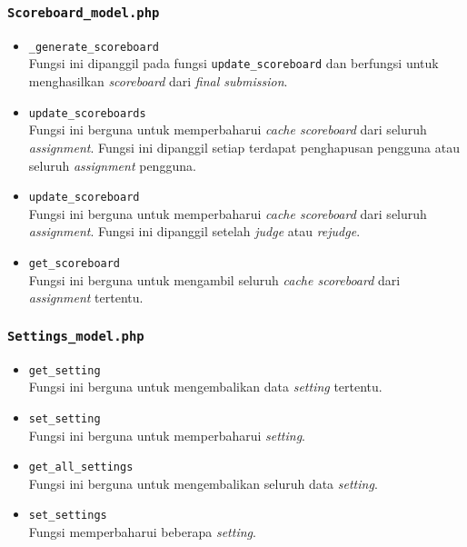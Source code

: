 \subsubsection{\texttt{Scoreboard\_model.php}}
\begin{itemize}
	\item \texttt{\_generate\_scoreboard}\\
	Fungsi ini dipanggil pada fungsi \texttt{update\_scoreboard} dan berfungsi untuk menghasilkan \textit{scoreboard} dari \textit{final submission}.
	\item \texttt{update\_scoreboards}\\
	Fungsi ini berguna untuk memperbaharui \textit{cache scoreboard} dari seluruh \textit{assignment}. Fungsi ini dipanggil setiap terdapat penghapusan pengguna atau seluruh \textit{assignment} pengguna.
	\item \texttt{update\_scoreboard}\\
	Fungsi ini berguna untuk memperbaharui \textit{cache scoreboard} dari seluruh \textit{assignment}. Fungsi ini dipanggil setelah \textit{judge} atau \textit{rejudge}.
	\item \texttt{get\_scoreboard}\\
	Fungsi ini berguna untuk mengambil seluruh \textit{cache scoreboard} dari \textit{assignment} tertentu.
\end{itemize}
\subsubsection{\texttt{Settings\_model.php}}
\begin{itemize}
	\item \texttt{get\_setting}\\
	Fungsi ini berguna untuk mengembalikan data \textit{setting} tertentu.
	\item \texttt{set\_setting}\\
	Fungsi ini berguna untuk memperbaharui \textit{setting}.
	\item \texttt{get\_all\_settings}\\
	Fungsi ini berguna untuk mengembalikan seluruh data \textit{setting}.
	\item \texttt{set\_settings}\\
	Fungsi memperbaharui beberapa \textit{setting}.
\end{itemize}

